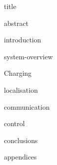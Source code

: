 \documentclass[11pt,titlepage]{report}
\begin{document}
{title}

\clearpage
{abstract}
\tableofcontents
				
\clearpage
{}
{introduction}

{system-overview}

{Charging}

{localisation}

{communication}

{control}

{conclusions}

\clearpage
{}
\printbibliography[heading=bibintoc]

\clearpage
{appendices}
\end{document}
